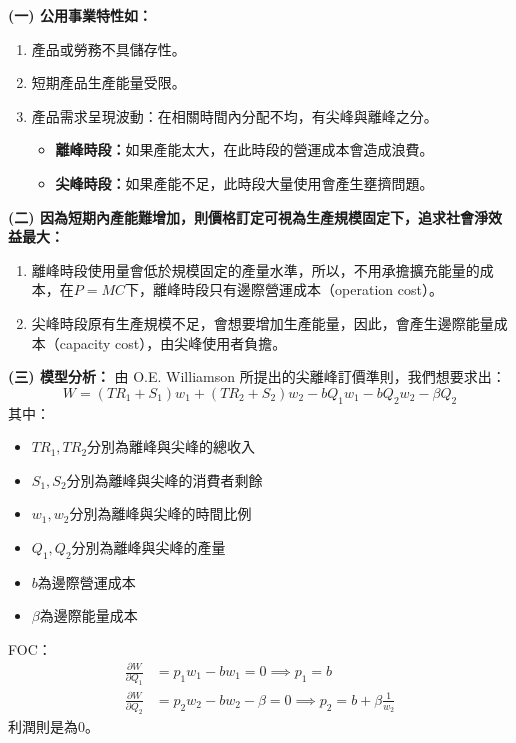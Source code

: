 \documentclass[12pt, a4paper]{article}
\begin{document}
\newpage

\vspace{0.5em} %

\noindent\textbf{(一) 公用事業特性如：}
\begin{enumerate}[label=\textbf{\arabic*.}, itemsep=0.5em, topsep=0.3em]
    \item 產品或勞務不具儲存性。
    \item 短期產品生產能量受限。
    \item 產品需求呈現波動：在相關時間內分配不均，有尖峰與離峰之分。
    \begin{itemize}[label=$\circ$, itemsep=0.2em, topsep=0.2em]
        \item \textbf{離峰時段：}如果產能太大，在此時段的營運成本會造成浪費。
        \item \textbf{尖峰時段：}如果產能不足，此時段大量使用會產生壅擠問題。
    \end{itemize}
\end{enumerate}
\noindent\textbf{(二) 因為短期內產能難增加，則價格訂定可視為生產規模固定下，追求社會淨效益最大：}
\begin{enumerate}[label=\textbf{\arabic*.}, itemsep=0.5em, topsep=0.3em]
    \item 離峰時段使用量會低於規模固定的產量水準，所以，不用承擔擴充能量的成本，在$P = MC$下，離峰時段只有邊際營運成本（operation cost）。
    \item 尖峰時段原有生產規模不足，會想要增加生產能量，因此，會產生邊際能量成本（capacity cost），由尖峰使用者負擔。
\end{enumerate}
\noindent\textbf{(三) 模型分析：}
由 O.E. Williamson 所提出的尖離峰訂價準則，我們想要求出：
\begin{equation*}
    W = (TR_1 + S_1)w_1 + (TR_2 + S_2)w_2 - bQ_1w_1 - bQ_2w_2 - \beta Q_2
\end{equation*}
其中：
\begin{itemize}
    \item $TR_1, TR_2$分別為離峰與尖峰的總收入
    \item $S_1, S_2$分別為離峰與尖峰的消費者剩餘
    \item $w_1, w_2$分別為離峰與尖峰的時間比例
    \item $Q_1, Q_2$分別為離峰與尖峰的產量
    \item $b$為邊際營運成本
    \item $\beta$為邊際能量成本
\end{itemize}
FOC：
\begin{align*}
    \frac{\partial W}{\partial Q_1} &= p_1w_1 - bw_1 = 0 \implies p_1 = b \\
    \frac{\partial W}{\partial Q_2} &= p_2w_2 - bw_2 - \beta = 0 \implies p_2 = b + \beta \frac{1}{w_2}
\end{align*}
利潤則是為0。
\end{document}
